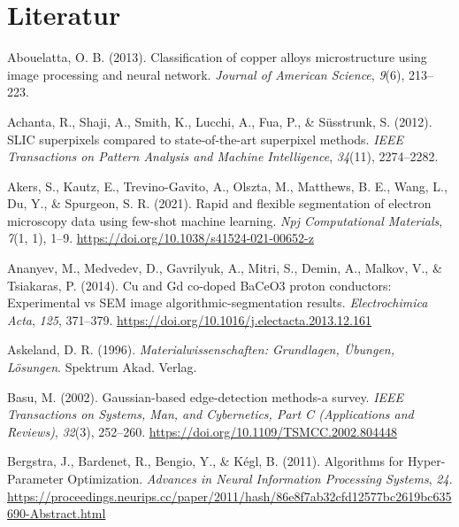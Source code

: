 \documentclass[
  12pt,
  openany]{book}
\newlength{\cslhangindent}
\newlength{\cslentryspacingunit} %
\newenvironment{CSLReferences}[2] %
 {%
  \setlength{\parindent}{0pt}
  \ifodd #1
  \let\oldpar\par
  \def\par{\hangindent=\cslhangindent\oldpar}
  \fi
  \setlength{\parskip}{#2\cslentryspacingunit}
 }%
 {}
\begin{document}
\hypertarget{literatur}{%
\chapter{Literatur}\label{literatur}}

\hypertarget{refs}{}
\begin{CSLReferences}{1}{0}
\leavevmode{}%
Abouelatta, O. B. (2013). Classification of copper alloys microstructure using image processing and neural network. \emph{Journal of American Science}, \emph{9}(6), 213--223.

\leavevmode{}%
Achanta, R., Shaji, A., Smith, K., Lucchi, A., Fua, P., \& Süsstrunk, S. (2012). {SLIC} superpixels compared to state-of-the-art superpixel methods. \emph{IEEE Transactions on Pattern Analysis and Machine Intelligence}, \emph{34}(11), 2274--2282.

\leavevmode{}%
Akers, S., Kautz, E., Trevino-Gavito, A., Olszta, M., Matthews, B. E., Wang, L., Du, Y., \& Spurgeon, S. R. (2021). Rapid and flexible segmentation of electron microscopy data using few-shot machine learning. \emph{Npj Computational Materials}, \emph{7}(1, 1), 1--9. \url{https://doi.org/10.1038/s41524-021-00652-z}

\leavevmode{}%
Ananyev, M., Medvedev, D., Gavrilyuk, A., Mitri, S., Demin, A., Malkov, V., \& Tsiakaras, P. (2014). Cu and {Gd} co-doped {BaCeO3} proton conductors: {Experimental} vs {SEM} image algorithmic-segmentation results. \emph{Electrochimica Acta}, \emph{125}, 371--379. \url{https://doi.org/10.1016/j.electacta.2013.12.161}

\leavevmode{}%
Askeland, D. R. (1996). \emph{Materialwissenschaften: {Grundlagen}, {Übungen}, {Lösungen}}. {Spektrum Akad. Verlag}.

\leavevmode{}%
Basu, M. (2002). Gaussian-based edge-detection methods-a survey. \emph{IEEE Transactions on Systems, Man, and Cybernetics, Part C (Applications and Reviews)}, \emph{32}(3), 252--260. \url{https://doi.org/10.1109/TSMCC.2002.804448}

\leavevmode{}%
Bergstra, J., Bardenet, R., Bengio, Y., \& Kégl, B. (2011). Algorithms for {Hyper-Parameter Optimization}. \emph{Advances in {Neural Information Processing Systems}}, \emph{24}. \url{https://proceedings.neurips.cc/paper/2011/hash/86e8f7ab32cfd12577bc2619bc635690-Abstract.html}


\end{CSLReferences}
\end{document}
